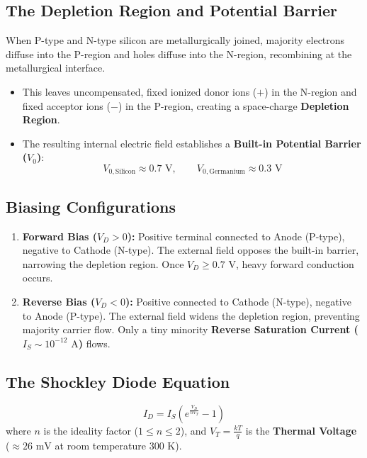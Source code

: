 \subsection{The Depletion Region and Potential Barrier}
When P-type and N-type silicon are metallurgically joined, majority electrons diffuse into the P-region and holes diffuse into the N-region, recombining at the metallurgical interface.
\begin{itemize}
    \item This leaves uncompensated, fixed ionized donor ions ($+$) in the N-region and fixed acceptor ions ($-$) in the P-region, creating a space-charge \textbf{Depletion Region}.
    \item The resulting internal electric field establishes a \textbf{Built-in Potential Barrier ($V_0$)}:
    \[ V_{0,\text{Silicon}} \approx 0.7\text{ V}, \qquad V_{0,\text{Germanium}} \approx 0.3\text{ V} \]
\end{itemize}

\subsection{Biasing Configurations}
\begin{enumerate}[label=\bfseries\arabic*.]
    \item \textbf{Forward Bias ($V_D > 0$):} Positive terminal connected to Anode (P-type), negative to Cathode (N-type). The external field opposes the built-in barrier, narrowing the depletion region. Once $V_D \ge 0.7\text{ V}$, heavy forward conduction occurs.
    \item \textbf{Reverse Bias ($V_D < 0$):} Positive connected to Cathode (N-type), negative to Anode (P-type). The external field widens the depletion region, preventing majority carrier flow. Only a tiny minority \textbf{Reverse Saturation Current ($I_S \sim 10^{-12}\text{ A}$)} flows.
\end{enumerate}

\subsection{The Shockley Diode Equation}
\begin{equation}
\label{eq:shockley_diode}
\boxed{I_D = I_S \left( e^{\frac{V_D}{n V_T}} - 1 \right)}
\end{equation}
where $n$ is the ideality factor ($1 \le n \le 2$), and $V_T = \frac{k T}{q}$ is the \textbf{Thermal Voltage} ($\approx 26\text{ mV}$ at room temperature $300\text{ K}$).


